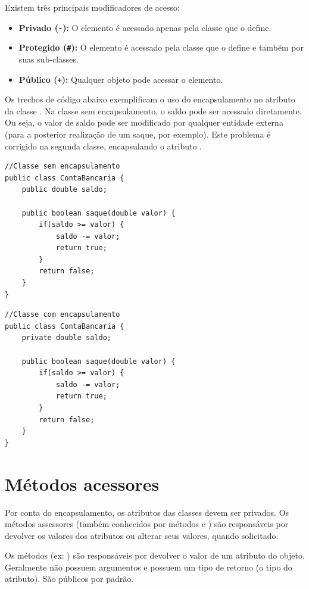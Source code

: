 Existem três principais modificadores de acesso:

\begin{itemize}
	\item \textbf{Privado (\texttt{-}):} O elemento é acessado apenas pela classe que o define.
	\item \textbf{Protegido (\texttt{\#}):} O elemento é acessado pela classe que o define e também por suas sub-classes.
	\item \textbf{Público (\texttt{+}):} Qualquer objeto pode acessar o elemento.
\end{itemize}

Os trechos de código abaixo exemplificam o uso do encapsulamento no atributo  da classe . Na classe sem encapsulamento, o saldo pode ser acessado diretamente. Ou seja, o valor de saldo pode ser modificado por qualquer entidade externa (para a posterior realização de um saque, por exemplo). Este problema é corrigido na segunda classe, encapsulando o atributo .

\begin{verbatim}
//Classe sem encapsulamento
public class ContaBancaria {
	public double saldo;
	
	public boolean saque(double valor) {
		if(saldo >= valor) {
			saldo -= valor;
			return true;
		}
		return false;
	}	
}
\end{verbatim}

\begin{verbatim}
//Classe com encapsulamento
public class ContaBancaria {
	private double saldo;

	public boolean saque(double valor) {
		if(saldo >= valor) {
			saldo -= valor;
			return true;
		}
		return false;
	}	
}
\end{verbatim}
 
 
\section{Métodos acessores}
Por conta do encapsulamento, os atributos das classes devem ser privados. Os métodos assessores (também conhecidos por métodos  e ) são responsáveis por devolver os valores dos atributos ou alterar seus valores, quando solicitado. 

Os métodos  (ex: ) são responsáveis por devolver o valor de um atributo do objeto. Geralmente não possuem argumentos e possuem um tipo de retorno (o tipo do atributo). São públicos por padrão.

